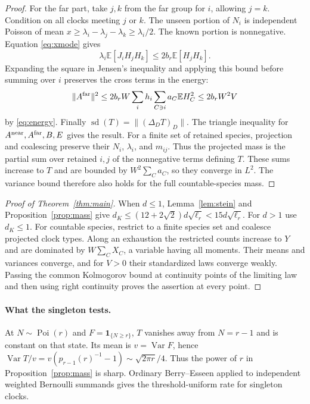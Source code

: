 \documentclass[11pt]{article}
\newcommand{\E}{\mathbb E}
\newcommand{\Var}{\operatorname{Var}}
\newcommand{\Poi}{\operatorname{Poi}}
\newcommand{\ind}{\mathbf1}
\newcommand{\sd}{\operatorname{sd}}
\numberwithin{equation}{section}
\begin{document}
\begin{proof}
For the far part, take $j,k$ from the far group for $i$, allowing $j=k$.
Condition on all clocks meeting $j$ or $k$. The unseen portion of $N_i$
is independent Poisson of mean $x\ge\lambda_i-\lambda_j-\lambda_k\ge\lambda_i/2$.
The known portion is nonnegative. Equation \eqref{eq:xmode} gives
\[
 \lambda_i\E[J_iH_jH_k]\le 2b_r\E[H_jH_k].
\]
Expanding the square in Jensen's inequality and applying this bound before
summing over $i$ preserves the cross terms in the energy:
\[
 \|A^{\rm far}\|^2
 \le 2b_r W\sum_i h_i\sum_{C\ni i}a_C\E H_C^2
 \le 2b_r W^2 V
\]
by \eqref{eq:energy}. Finally $\sd(T)=\|(\Delta_D T)_D\|$.
The triangle inequality for $A^{\rm near}, A^{\rm far}, B,E$ gives the result.
For a finite set of retained species, projection and coalescing preserve their
$N_i$, $\lambda_i$, and $m_{ij}$. Thus the projected mass is the partial
sum over retained $i,j$ of the nonnegative terms defining $T$. These sums
increase to $T$ and are bounded by $W^2\sum_C a_C$, so they converge in $L^2$.
The variance bound therefore also holds for the full countable-species mass.
\end{proof}

\begin{proof}[Proof of Theorem~\ref{thm:main}]
When $d\le1$, Lemma~\ref{lem:stein} and Proposition~\ref{prop:mass} give
$d_K\le(12+2\sqrt2)d\sqrt{\ell_r}<15d\sqrt{\ell_r}$.
For $d>1$ use $d_K\le1$.
For countable species, restrict to a finite species set and coalesce projected
clock types. Along an exhaustion the restricted counts increase to $Y$ and are
dominated by $W\sum_C X_C$, a variable having all moments.
Their means and variances converge, and for $V>0$ their standardized laws
converge weakly. Passing the common Kolmogorov bound at continuity points of
the limiting law and then using right continuity proves the assertion at every point.
\end{proof}

\paragraph{What the singleton tests.}
At $N\sim\Poi(r)$ and $F=\ind_{\{N\ge r\}}$, $T$ vanishes away from $N=r-1$
and is constant on that state. Its mean is $v=\Var F$, hence
$\Var T/v=v(p_{r-1}(r)^{-1}-1)\sim\sqrt{2\pi r}/4$.
Thus the power of $r$ in Proposition~\ref{prop:mass} is sharp. Ordinary
Berry--Esseen applied to independent weighted Bernoulli summands gives the
threshold-uniform rate for singleton clocks.
\end{document}
